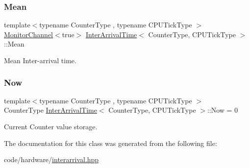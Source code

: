 \subsubsection{\texorpdfstring{Mean}{Mean}}
{\footnotesize\ttfamily template$<$typename Counter\+Type , typename C\+P\+U\+Tick\+Type $>$ \\
\hyperlink{classMonitorChannel}{Monitor\+Channel}$<$true$>$ \hyperlink{classInterArrivalTime}{Inter\+Arrival\+Time}$<$ Counter\+Type, C\+P\+U\+Tick\+Type $>$\+::Mean}



Mean Inter-\/arrival time. 

\mbox{\label{classInterArrivalTime_aa0126b0de317f9b1b7660cfe305b5779}} 
\subsubsection{\texorpdfstring{Now}{Now}}
{\footnotesize\ttfamily template$<$typename Counter\+Type , typename C\+P\+U\+Tick\+Type $>$ \\
Counter\+Type \hyperlink{classInterArrivalTime}{Inter\+Arrival\+Time}$<$ Counter\+Type, C\+P\+U\+Tick\+Type $>$\+::Now = 0}



Current Counter value storage. 



The documentation for this class was generated from the following file\+:\begin{DoxyCompactItemize}
\item 
code/hardware/\hyperlink{interarrival_8hpp}{interarrival.\+hpp}\end{DoxyCompactItemize}

